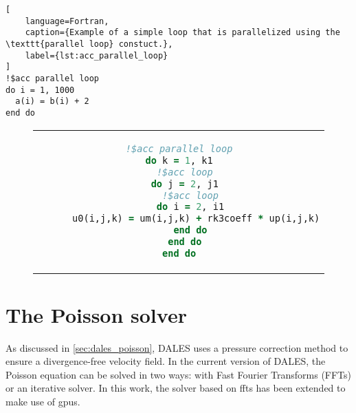 \begin{lstlisting}[
    language=Fortran,
    caption={Example of a simple loop that is parallelized using the \texttt{parallel loop} constuct.},
    label={lst:acc_parallel_loop}
]
!$acc parallel loop
do i = 1, 1000
  a(i) = b(i) + 2
end do
\end{lstlisting}

\begin{figure}[H]
  \centering
  \label{lst:acc_parallel_loop_nested}
  \begin{adjustbox}{valign=t, minipage=0.48\linewidth}
    \centering
    \begin{tabular}{c}
      \begin{lstlisting}[language=Fortran]
!$acc parallel loop
do k = 1, k1
  !$acc loop
  do j = 2, j1
    !$acc loop
    do i = 2, i1
      u0(i,j,k) = um(i,j,k) + rk3coeff * up(i,j,k)
    end do
  end do
end do
      \end{lstlisting}
    \end{tabular}
  \end{adjustbox}
  \hfill
  \begin{adjustbox}{valign=t, minipage=0.48\linewidth}
    \centering
    \begin{tabular}{c}
      \begin{lstlisting}[language=Fortran]
!$acc parallel loop collapse(3)
do k = 1, k1
  do j = 2, j1
    do i = 2, i1
      u0(i,j,k) = um(i,j,k) + rk3coeff * up(i,j,k)
    end do
  end do
end do
      \end{lstlisting}
    \end{tabular}
  \end{adjustbox}
\end{figure}


\section{The Poisson solver} \label{sec:poisson_solver}
As discussed in \autoref{sec:dales_poisson}, DALES uses a pressure correction method to ensure a divergence-free velocity field. In the current version of DALES, the Poisson equation can be solved in two ways: with Fast Fourier Transforms (FFTs) or an iterative solver. In this work, the solver based on \acrshort{fft}s has been extended to make use of \acrshort{gpu}s.

